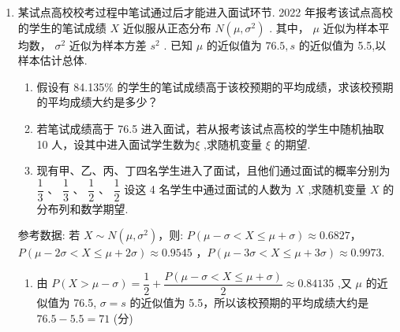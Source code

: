 \begin{enumerate}
\begin{enumerate}
\begin{jieda}
\begin{enumerate}
                所以每家企业得分不低于 19 分的概率为 0.9772 .
                
                则得分不低于 19 分的企业数 $\xi  \sim  B\left( {{100},{0.9772}}\right)$ .
                
                其中恰有 $k$ 家企业得分不低于 19 分的概率为 $P\left( {\xi  = k}\right)  = {{C}}_{100}^{k}{p}^{k}{\left( 1 - p\right) }^{{100} - k}$ ,
                
                令 $\dfrac{P\left( {\xi  = k}\right) }{P\left( {\xi  = k - 1}\right) } = \dfrac{\left( {{101} - k}\right) p}{\left( {1 - p}\right) k} > 1,\dfrac{P\left( {\xi  = k}\right) }{P\left( {\xi  = k + 1}\right) } = \dfrac{\left( {k + 1}\right) \left( {1 - p}\right) }{\left( {{100} - k}\right) p} > 1$ ,
                
                可得 ${101p} - 1 < k < {101p},{101p} = {98.6972}$ ,解得 $k = {98}$ ,
                
                故在走访的 100 家化工企业中, 分数不低于 19 分的企业有 98 家时概率最大.
            \end{enumerate}
        \end{jieda}
        \item 某试点高校校考过程中笔试通过后才能进入面试环节. 2022 年报考该试点高校的学生的笔试成绩 $X$ 近似服从正态分布 $N\left( {\mu ,{\sigma }^{2}}\right)$ . 其中， $\mu$ 近似为样本平均数， ${\sigma }^{2}$ 近似为样本方差 ${s}^{2}$ . 已知 $\mu$ 的近似值为 ${76.5},s$ 的近似值为 5.5,以样本估计总体.
        \begin{enumerate}
            \item 假设有 84.135\% 的学生的笔试成绩高于该校预期的平均成绩，求该校预期的平均成绩大约是多少？
            
            \item 若笔试成绩高于 76.5 进入面试，若从报考该试点高校的学生中随机抽取 10 人，设其中进入面试学生数为$\xi$ ,求随机变量 $\xi$ 的期望.
            
            \item 现有甲、乙、丙、丁四名学生进入了面试，且他们通过面试的概率分别为 $\dfrac{1}{3}\text{ 、 }\dfrac{1}{3}\text{ 、 }\dfrac{1}{2}\text{ 、 }\dfrac{1}{2}$ 设这 4 名学生中通过面试的人数为 $X$ ,求随机变量 $X$ 的分布列和数学期望.
        \end{enumerate}
        
        参考数据: 若 $X \sim  N\left( {\mu ,{\sigma }^{2}}\right)$，则: $P\left( {\mu  - \sigma  < X \leq  \mu  + \sigma }\right)  \approx  {0.6827}$，$P\left( {\mu  - {2\sigma } < X \leq  \mu  + {2\sigma }}\right)  \approx  {0.9545}$ ，$P\left( {\mu  - {3\sigma } < X \leq  \mu  + {3\sigma }}\right)  \approx  {0.9973}.$
        \begin{jieda}
            \begin{enumerate}
                \item 由 $P\left( {X > \mu  - \sigma }\right)  = \dfrac{1}{2} + \dfrac{P\left( {\mu  - \sigma  < X \leq  \mu  + \sigma }\right) }{2} \approx  {0.84135}$ ,又 $\mu$ 的近似值为 76.5, $\sigma  = s$ 的近似值为 5.5，所以该校预期的平均成绩大约是 ${76.5} - {5.5} = {71}$ (分)
                

\end{enumerate}
\end{jieda}
\end{enumerate}
\end{enumerate}
